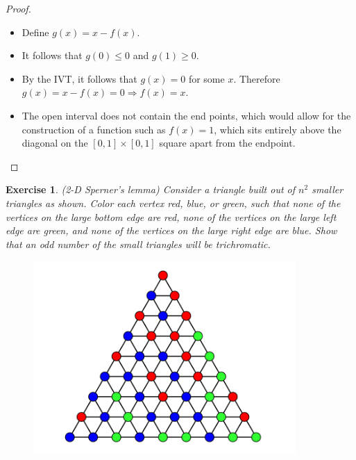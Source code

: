 \documentclass[12pt]{article}
\newtheorem{exercise}{Exercise}
\begin{document}
\begin{proof}
    \begin{itemize}
        \item Define $g(x) = x - f(x)$.
        \item It follows that $g(0) \leq 0$ and $g(1) \geq 0$.
        \item By the IVT, it follows that $g(x) = 0$ for some $x$. Therefore $g(x) = x - f(x) = 0 \Rightarrow f(x) = x$.
        \item The open interval does not contain the end points, which would allow for the construction of a function such as $f(x) = 1$, which sits entirely above the diagonal on the $[0,1] \times [0,1]$ square apart from the endpoint.
    \end{itemize}
\end{proof}

\begin{exercise}
    (2-D Sperner's lemma) Consider a triangle built out of $n^2$ smaller triangles as shown. Color each vertex red, blue, or green, such that none of the vertices on the large bottom edge are red, none of the vertices on the large left edge are green, and none of the vertices on the large right edge are blue. Show that an odd number of the small triangles will be trichromatic.
\end{exercise}

\begin{figure}[h]
    \centering
    \includegraphics[width=10cm]{fixed_points_2.png}
    \label{fig:my_label}
\end{figure}
\end{document}
